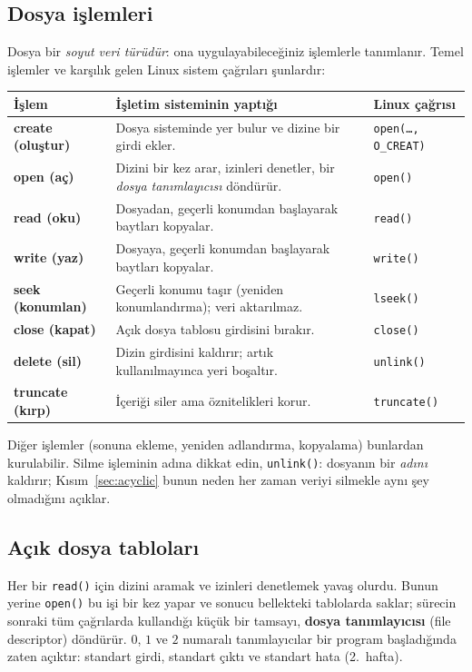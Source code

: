 \documentclass[11pt,a4paper]{article}
\newcommand{\term}[1]{\textbf{\color{mintdeep}#1}}
\newcommand{\cmd}[1]{\texttt{#1}}
\begin{document}
\subsection{Dosya işlemleri}

Dosya bir \emph{soyut veri türüdür}: ona uygulayabileceğiniz işlemlerle tanımlanır. Temel işlemler ve karşılık gelen Linux sistem çağrıları şunlardır:

\begin{center}
\renewcommand{\arraystretch}{1.25}
\begin{tabularx}{\linewidth}{>{\bfseries}l >{\raggedright\arraybackslash}X l}
\toprule
\textbf{İşlem} & \textbf{İşletim sisteminin yaptığı} & \textbf{Linux çağrısı} \\
\midrule
create (oluştur) & Dosya sisteminde yer bulur ve dizine bir girdi ekler. & \cmd{open(\dots, O\_CREAT)} \\
open (aç) & Dizini bir kez arar, izinleri denetler, bir \emph{dosya tanımlayıcısı} döndürür. & \cmd{open()} \\
read (oku) & Dosyadan, geçerli konumdan başlayarak baytları kopyalar. & \cmd{read()} \\
write (yaz) & Dosyaya, geçerli konumdan başlayarak baytları kopyalar. & \cmd{write()} \\
seek (konumlan) & Geçerli konumu taşır (yeniden konumlandırma); veri aktarılmaz. & \cmd{lseek()} \\
close (kapat) & Açık dosya tablosu girdisini bırakır. & \cmd{close()} \\
delete (sil) & Dizin girdisini kaldırır; artık kullanılmayınca yeri boşaltır. & \cmd{unlink()} \\
truncate (kırp) & İçeriği siler ama öznitelikleri korur. & \cmd{truncate()} \\
\bottomrule
\end{tabularx}
\end{center}

Diğer işlemler (sonuna ekleme, yeniden adlandırma, kopyalama) bunlardan kurulabilir. Silme işleminin adına dikkat edin, \cmd{unlink()}: dosyanın bir \emph{adını} kaldırır; Kısım~\ref{sec:acyclic} bunun neden her zaman veriyi silmekle aynı şey olmadığını açıklar.

\subsection{Açık dosya tabloları}

Her bir \cmd{read()} için dizini aramak ve izinleri denetlemek yavaş olurdu. Bunun yerine \cmd{open()} bu işi bir kez yapar ve sonucu bellekteki tablolarda saklar; sürecin sonraki tüm çağrılarda kullandığı küçük bir tamsayı, \term{dosya tanımlayıcısı} (file descriptor) döndürür. $0$, $1$ ve $2$ numaralı tanımlayıcılar bir program başladığında zaten açıktır: standart girdi, standart çıktı ve standart hata (2.\ hafta).
\end{document}
